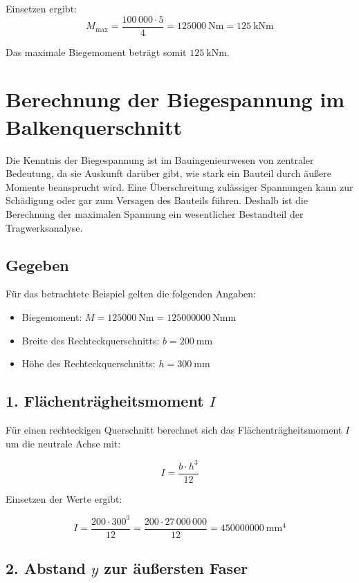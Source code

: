 Einsetzen ergibt:
\[
M_\text{max} = \frac{100\,000 \cdot 5}{4} = \SI{125000}{\newton\meter} = \SI{125}{\kilo\newton\meter}
\]

Das maximale Biegemoment beträgt somit \(\boxed{\SI{125}{\kilo\newton\meter}}\).

\section*{Berechnung der Biegespannung im Balkenquerschnitt}

Die Kenntnis der Biegespannung ist im Bauingenieurwesen von zentraler Bedeutung, da sie Auskunft darüber gibt, wie stark ein Bauteil durch äußere Momente beansprucht wird. 
Eine Überschreitung zulässiger Spannungen kann zur Schädigung oder gar zum Versagen des Bauteils führen. 
Deshalb ist die Berechnung der maximalen Spannung ein wesentlicher Bestandteil der Tragwerksanalyse.

\subsection*{Gegeben}

Für das betrachtete Beispiel gelten die folgenden Angaben:

\begin{itemize}
  \item Biegemoment: $M = \SI{125000}{\newton\meter} = \SI{125000000}{\newton\milli\meter}$
  \item Breite des Rechteckquerschnitts: $b = \SI{200}{\milli\meter}$
  \item Höhe des Rechteckquerschnitts: $h = \SI{300}{\milli\meter}$
\end{itemize}

\subsection*{1. Flächenträgheitsmoment $I$}

Für einen rechteckigen Querschnitt berechnet sich das Flächenträgheitsmoment $I$ um die neutrale Achse mit:

\[
I = \frac{b \cdot h^3}{12}
\]

Einsetzen der Werte ergibt:

\[
I = \frac{200 \cdot 300^3}{12} = \frac{200 \cdot 27\,000\,000}{12} = \SI{450000000}{\milli\meter^4}
\]

\subsection*{2. Abstand $y$ zur äußersten Faser}


